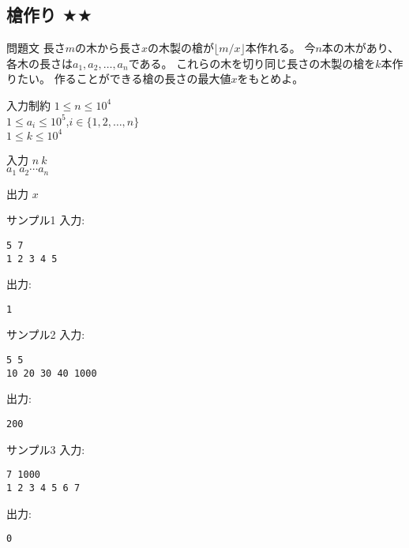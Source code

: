 \documentclass[a4paper,twoside,onecolumn,openany,article,10pt]{memoir}
\theoremstyle{remark}
\begin{document}
\clearpage
\subsection{槍作り $\bigstar\bigstar$}
\begin{itembox}[l]{問題文}
長さ$m$の木から長さ$x$の木製の槍が$\lfloor m/x\rfloor$本作れる。
今$n$本の木があり、各木の長さは$a_1,a_2,\dotsc,a_n$である。
これらの木を切り同じ長さの木製の槍を$k$本作りたい。
作ることができる槍の長さの最大値$x$をもとめよ。
\end{itembox}

\begin{itembox}[l]{入力制約}
$1\le n\le 10^4$\\
$1\le a_i\le 10^5$,\hspace{2em}$i\in\{1,2,\dotsc,n\}$\\
$1\le k\le 10^4$
\end{itembox}

\begin{itembox}[l]{入力}
$n~k$\\
$a_1~a_2 \dotsb a_n$
\end{itembox}

\begin{itembox}[l]{出力}
$x$
\end{itembox}

\begin{itembox}[l]{サンプル1}
入力:
\begin{verbatim}
5 7
1 2 3 4 5
\end{verbatim}
出力:
\begin{verbatim}
1
\end{verbatim}
\end{itembox}

\begin{itembox}[l]{サンプル2}
入力:
\begin{verbatim}
5 5
10 20 30 40 1000
\end{verbatim}
出力:
\begin{verbatim}
200
\end{verbatim}
\end{itembox}

\begin{itembox}[l]{サンプル3}
入力:
\begin{verbatim}
7 1000
1 2 3 4 5 6 7
\end{verbatim}
出力:
\begin{verbatim}
0
\end{verbatim}
\end{itembox}
\end{document}
